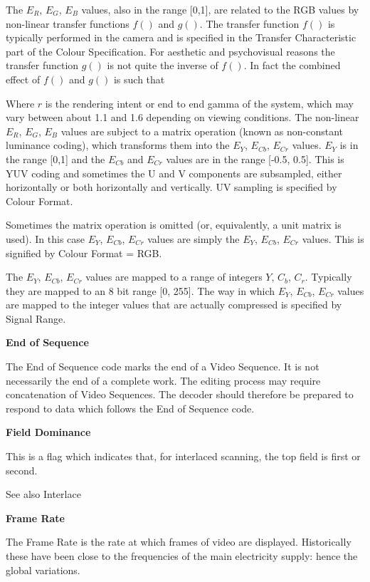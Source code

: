 The $E_R$, $E_G$, $E_B$ values, also in the range [0,1], are related to
the RGB values by non-linear transfer functions $f()$ and $g()$. The
transfer function $f()$ is typically performed in the camera and is
specified in the Transfer Characteristic part of the Colour
Specification. For aesthetic and psychovisual reasons the transfer
function $g()$ is not quite the inverse of $f()$. In fact the combined
effect of $f()$ and $g()$ is such that

Where $r$ is the rendering intent or end to end gamma of the system,
which may vary between about 1.1 and 1.6 depending on viewing
conditions. The non-linear $E_R$, $E_G$, $E_B$ values are subject to a
matrix operation (known as non-constant luminance coding), which
transforms them into the $E_Y$, $E_{Cb}$, $E_{Cr}$ values. $E_Y$ is in
the range [0,1] and the $E_{Cb}$ and $E_{Cr}$ values are in the range
[-0.5, 0.5]. This is YUV coding and sometimes the U and V components are
subsampled, either horizontally or both horizontally and vertically. UV
sampling is specified by Colour Format.

Sometimes the matrix operation is omitted (or, equivalently, a unit
matrix is used). In this case $E_Y$, $E_{Cb}$, $E_{Cr}$ values are
simply the $E_Y$, $E_{Cb}$, $E_{Cr}$ values. This is signified by Colour
Format = RGB.

The $E_Y$, $E_{Cb}$, $E_{Cr}$ values are mapped to a range of integers
$Y$, $C_{b}$, $C_{r}$. Typically they are mapped to an 8 bit range [0,
255]. The way in which $E_Y$, $E_{Cb}$, $E_{Cr}$ values are mapped to
the integer values that are actually compressed is specified by Signal
Range.

\textbf{End of Sequence}

The End of Sequence code marks the end of a Video Sequence. It is not
necessarily the end of a complete work. The editing process may require
concatenation of Video Sequences. The decoder should therefore be
prepared to respond to data which follows the End of Sequence code.

\textbf{Field Dominance }

This is a flag which indicates that, for interlaced scanning, the top
field is first or second.

See also Interlace

\textbf{Frame Rate}

The Frame Rate is the rate at which frames of video are displayed.
Historically these have been close to the frequencies of the main
electricity supply: hence the global variations.


